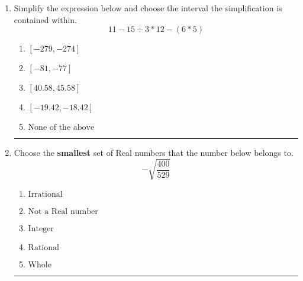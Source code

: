 \documentclass[14pt]{extbook}
\newcommand{\litem}[1]{\item#1\hspace*{-1cm}\rule{\textwidth}{0.4pt}}
\begin{document}
\begin{enumerate}
{\begin{enumerate}[label=\Alph*.]
\end{enumerate} }
\litem{
Simplify the expression below and choose the interval the simplification is contained within.\[ 11 - 15 \div 3 * 12 - (6 * 5) \]\begin{enumerate}[label=\Alph*.]
\item \( [-279, -274] \)
\item \( [-81, -77] \)
\item \( [40.58, 45.58] \)
\item \( [-19.42, -18.42] \)
\item \( \text{None of the above} \)

\end{enumerate} }
\litem{
Choose the \textbf{smallest} set of Real numbers that the number below belongs to.\[ -\sqrt{\frac{400}{529}} \]\begin{enumerate}[label=\Alph*.]
\item \( \text{Irrational} \)
\item \( \text{Not a Real number} \)
\item \( \text{Integer} \)
\item \( \text{Rational} \)
\item \( \text{Whole} \)

\end{enumerate} }
\end{enumerate}
\end{document}
